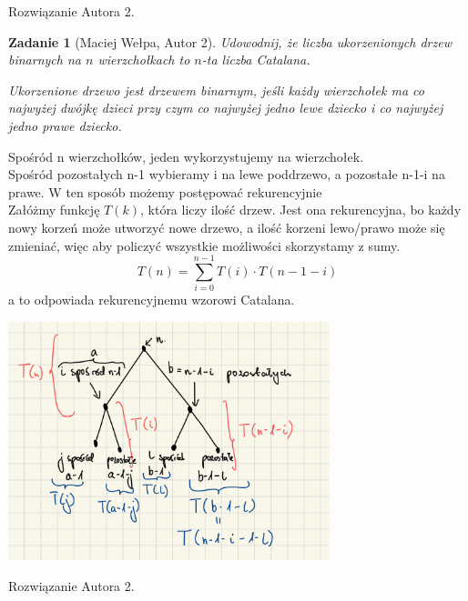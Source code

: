 \documentclass{mwart}
\newtheorem{zad}{Zadanie}[section]
\begin{document}
\begin{mdframed}
    Rozwiązanie Autora 2.
\end{mdframed}




\begin{zad}[Maciej Wełpa, Autor 2]
    Udowodnij, że liczba ukorzenionych drzew binarnych na $n$ wierzchołkach to $n$-ta liczba Catalana.

    Ukorzenione drzewo jest drzewem binarnym, jeśli każdy wierzchołek ma co najwyżej
    dwójkę dzieci przy czym co najwyżej jedno lewe dziecko i co najwyżej jedno prawe dziecko.
\end{zad}
\begin{mdframed}
    Spośród n wierzchołków, jeden wykorzystujemy na wierzchołek.\\
    Spośród pozostałych n-1 wybieramy i na lewe poddrzewo, a pozostałe n-1-i na prawe. W ten sposób możemy postępować rekurencyjnie\\
    Załóżmy funkcję \( T(k) \), która liczy ilość drzew. Jest ona rekurencyjna, bo każdy nowy korzeń może utworzyć nowe drzewo, a ilość korzeni lewo/prawo może się zmieniać, więc aby policzyć wszystkie możliwości skorzystamy z sumy.
    \[
        T(n) = \sum_{i=0}^{n-1} T(i) \cdot T(n-1-i)
    \]
    a to odpowiada rekurencyjnemu wzorowi Catalana.
    \begin{center}
        \includegraphics[width=0.7\textwidth]{images/zad36.jpeg}
    \end{center}

\end{mdframed}
\begin{mdframed}
    Rozwiązanie Autora 2.
\end{mdframed}
\end{document}

